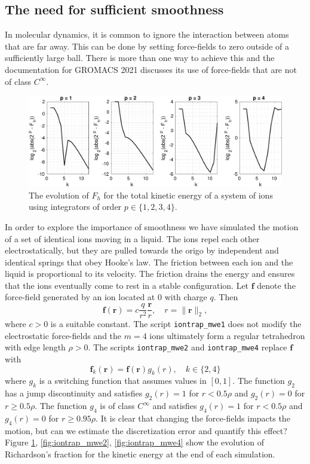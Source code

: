 \documentclass[runningheads]{llncs}
\begin{document}
\subsection{The need for sufficient smoothness}

In molecular dynamics, it is common to ignore the interaction between atoms that are far away. This can be done by setting force-fields to zero outside of a sufficiently large ball. There is more than one way to achieve this and the documentation for GROMACS 2021 discusses its use of force-fields that are not of class $C^{\infty}$.

\begin{figure}[h!]
  \centering
  \includegraphics[width=\linewidth]{iontrap_mwe1.pdf}
  \caption{The evolution of $F_h$ for the total kinetic energy of a system of ions using integrators of order $p \in \{1,2,3,4\}$.}
  \label{fig:iontrap_mwe1}
\end{figure}

In order to explore the importance of smoothness we have simulated the motion of a set of identical ions moving in a liquid. The ions repel each other electrostatically, but they are pulled towards the origo by independent and identical springs that obey Hooke's law. The friction between each ion and the liquid is proportional to its velocity. The friction drains the energy and ensures that the ions eventually come to rest in a stable configuration. 
Let $\bm{f}$ denote the force-field generated by an ion located at $0$ with charge $q$. Then
\begin{equation}
  \bm{f}(\bm{r}) = c \frac{q}{r^2} \frac{\bm{r}}{r}, \quad r = \|\bm{r}\|_2,
\end{equation}
where $c > 0$ is a suitable constant. The script {\tt iontrap\_mwe1} does not modify the electrostatic force-fields and the $m=4$ ions ultimately form a regular tetrahedron with edge length $\rho > 0$.
The scripts {\tt iontrap\_mwe2} and {\tt iontrap\_mwe4} replace $\bm{f}$ with
\begin{equation}
  \bm{f}_k(\bm{r}) = \bm{f}(\bm{r}) g_k(r), \quad k \in \{2, 4\}
\end{equation}
where $g_k$ is a switching function that assumes values in $[0,1]$. The function $g_2$ has a jump discontinuity and satisfies $g_2(r) = 1$ for $r < 0.5 \rho$ and $g_2(r) = 0$ for $r \ge 0.5 \rho$. The function $g_4$ is of class $C^\infty$ and satisfies $g_4(r) = 1$ for $r < 0.5 \rho$ and $g_4(r) = 0$ for $r \ge 0.95 \rho$. It is clear that changing the force-fields impacts the motion, but can we estimate the discretization error and quantify this effect? Figure \ref{fig:iontrap_mwe1}, \ref{fig:iontrap_mwe2}, \ref{fig:iontrap_mwe4} show the evolution of Richardson's fraction for the kinetic energy at the end of each simulation.
\end{document}

